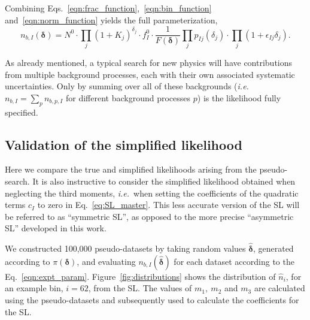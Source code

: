 \documentclass[11pt]{article}
\def\ie{{\it i.e.}}
\begin{document}
Combining Eqs.~\eqref{eqn:frac_function},~\eqref{eqn:bin_function} and~\eqref{eqn:norm_function} yields the full parameterization,
%
\begin{equation}
 n_{b,I}(\bm{\delta}) = N^{0}\cdot \prod_{j}(1+K_{j})^{\delta_{j}} \cdot f^{0}_{I} \cdot\frac{1}{F(\bm{\delta})} \prod_{j} p_{Ij}(\delta_{j}) \cdot \prod_{j} (1+\epsilon_{Ij}\delta_{j}).
\label{eqn:expt_param}
\end{equation}

As already mentioned, a typical search for new physics will have contributions from multiple background processes, each with their own associated systematic uncertainties.
Only by summing over all of these backgrounds (\ie\ $n_{b,I}=\sum_{p}n_{b,p,I}$ for different background processes $p$) is the likelihood fully specified.









\subsection{Validation of the simplified likelihood}


Here we compare the true and simplified likelihoods arising from the pseudo-search. It is also instructive to consider the simplified likelihood obtained when neglecting the third moments, \ie\ when setting the coefficients of the quadratic terms $c_I$ to zero in Eq.~\eqref{eq:SL_master}. This less accurate version of the SL will be  referred to as ``symmetric SL'', as opposed to the more precise ``asymmetric SL'' developed in this work. 


We constructed 100,000 pseudo-datasets by taking random values ${\hat{\bm{\delta}}}$, generated according to $\pi(\bm{\delta})$, and evaluating
$n_{b,I}(\hat{\bm{\delta}})$ for each dataset according to the Eq.~\eqref{eqn:expt_param}. Figure~\ref{fig:distributions} shows the distribution of $\hat{n}_{i}$, for an example bin, $i=62$,
from the SL. The values of $m_{1},~m_{2}$ and $m_{3}$ are calculated using the pseudo-datasets and subsequently used to calculate the coefficients for the SL.
\end{document}
